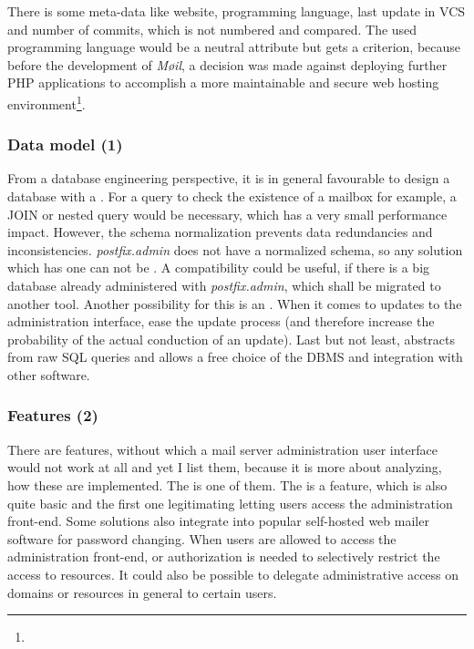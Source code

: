 \documentclass[12pt,a4paper]{scrartcl}
\begin{document}
			There is some meta-data like website, programming language, last
			update in VCS and number of commits, which is not numbered and
			compared. The used programming language would be a neutral
			attribute but gets a criterion, because before the development of
			\emph{Møil}, a decision was made against deploying further PHP
			applications to accomplish a more maintainable and secure web
			hosting environment\footnote{\urlPHPBashing}.


			\subsubsection{Data model (1)}
				From a database engineering perspective, it is in general
				favourable to design a database with a  \cite{dbnorm}. For a query to
				check the existence of a mailbox for example, a JOIN or nested
				query would be necessary, which has a very small performance
				impact. However, the schema normalization prevents data
				redundancies and inconsistencies. \emph{postfix.admin} does not
				have a normalized schema, so any solution which has one can not
				be . A
				compatibility could be useful, if there is a big database
				already administered with \emph{postfix.admin}, which shall be
				migrated to another tool. Another possibility for this is an
				. When it comes
				to updates to the administration interface,  ease the update process
				(and therefore increase the probability of the actual
				conduction of an update). Last but not least,  abstracts from raw \ac{SQL} queries
				and allows a free choice of the \ac{DBMS} and integration with
				other software.

			\subsubsection{Features (2)}
				There are features, without which a mail server administration
				user interface would not work at all and yet I list them,
				because it is more about analyzing, how these are implemented.
				The  is
				one of them. The  is a feature, which is also quite basic and the
				first one legitimating letting users access the administration
				front-end. Some solutions also integrate into popular
				self-hosted web mailer software for password changing. When
				users are allowed to access the administration front-end,
				 or authorization is needed to
				selectively restrict the access to resources. It could also be
				possible to delegate administrative access on domains or
				resources in general to certain users.
				\s
\end{document}
